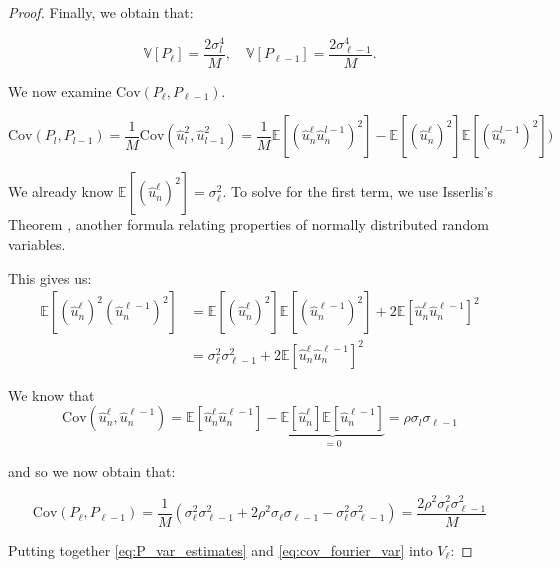 \begin{proof}
    Finally, we obtain that:

    \begin{equation}\label{eq:P_var_estimates}
        \mathbb{V}[P_\ell] = \frac{2\sigma_l^4}{M}, \quad 
        \mathbb{V}[P_{\ell-1}] = \frac{2\sigma_{\ell-1}^4}{M}.
    \end{equation}

    We now examine $\mathrm{Cov}\left(P_\ell, P_{\ell-1}\right)$.

    \begin{equation*}
        \mathrm{Cov}(P_l, P_{l-1}) = 
        \frac{1}{M}\mathrm{Cov}(\hat{u}_l^2, \hat{u}_{l-1}^2) 
        = \frac{1}{M}\mathbb{E}[(\hat{u}_n^\ell \hat{u}_n^{l-1})^2] 
        - \mathbb{E}[(\hat{u}_n^\ell)^2]\mathbb{E}[(\hat{u}_n^{l-1})^2])
    \end{equation*}

    We already know $\mathbb{E}[(\hat{u}_n^\ell)^2] = \sigma_\ell^2$.
    To solve for the first term, we use Isserlis's Theorem 
    \cite{isserlis1918formula}, another 
    formula relating properties of normally distributed random variables.

    This gives us:
    \begin{align*}
        \mathbb{E}\left[(\hat{u}_n^\ell)^2(\hat{u}_n^{\ell-1})^2\right] 
        &= \mathbb{E}[(\hat{u}_n^{\ell})^2]\mathbb{E}[(\hat{u}_n^{\ell-1})^2]
         + 2\mathbb{E}[\hat{u}_n^\ell \hat{u}_n^{\ell-1}]^2 \\
        &= \sigma_\ell^2 \sigma_{\ell-1}^2 + 
        2\mathbb{E}[\hat{u}_n^\ell \hat{u}_n^{\ell-1}]^2
    \end{align*}

    We know that 
    $$
    \mathrm{Cov}(\hat{u}_n^\ell, \hat{u}_n^{\ell-1})
    = \mathbb{E}[\hat{u}_n^\ell \hat{u}_n^{\ell-1}] - 
    \underbrace{\mathbb{E}[\hat{u}_n^\ell]\mathbb{E}[\hat{u}_n^{\ell-1}]}_{=0}
    =\rho \sigma_l \sigma_{\ell-1}
    $$

    and so we now obtain that:

    \begin{equation}\label{eq:cov_fourier_var}
        \mathrm{Cov}(P_\ell, P_{\ell-1}) = 
        \frac{1}{M}\left(\sigma_\ell^2 \sigma_{\ell-1}^2 + 
        2\rho^2\sigma_\ell \sigma_{\ell-1} - 
        \sigma_\ell^2 \sigma_{\ell-1}^2\right)
        = \frac{2\rho^2\sigma_\ell^2\sigma_{\ell-1}^2}{M}
    \end{equation}

    Putting together \eqref{eq:P_var_estimates} and 
    \eqref{eq:cov_fourier_var} into $V_\ell$:


\end{proof}

